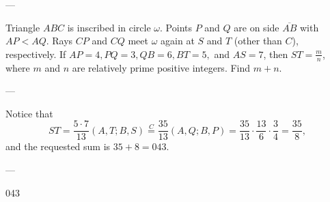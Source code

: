 
---

Triangle $ABC$ is inscribed in circle $\omega$. Points $P$ and $Q$ are on side $\overline{AB}$ with $AP<AQ$. Rays $CP$ and $CQ$ meet $\omega$ again at $S$ and $T$ (other than $C$), respectively. If $AP=4,PQ=3,QB=6,BT=5,$ and $AS=7$, then $ST=\tfrac{m}{n}$, where $m$ and $n$ are relatively prime positive integers. Find $m+n$.

---

Notice that \[ST=\frac{5\cdot 7}{13}(A,T;B,S)\stackrel{C}{=}\frac{35}{13}(A,Q;B,P)=\frac{35}{13}\cdot\frac{13}6\cdot\frac34=\frac{35}8,\]
and the requested sum is $35+8=043$.

---

043
